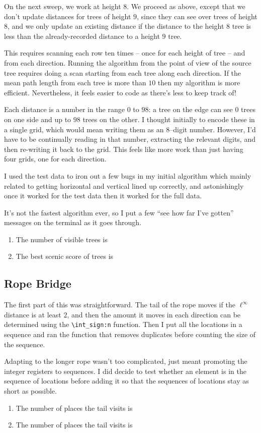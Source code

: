 \documentclass{article}
\begin{document}
On the next sweep, we work at height \(8\).
We proceed as above, except that we don't update distances for trees of height \(9\), since they can see over trees of height \(8\), and we only update an existing distance if the distance to the height \(8\) tree is less than the already-recorded distance to a height \(9\) tree.


This requires scanning each row ten times -- once for each height of tree --  and from each direction.
Running the algorithm from the point of view of the source tree requires doing a scan starting from each tree along each direction.
If the mean path length from each tree is more than \(10\) then my algorithm is more efficient.
Nevertheless, it feels easier to code as there's less to keep track of!

Each distance is a number in the range \(0\) to \(98\): a tree on the edge can see \(0\) trees on one side and up to \(98\) trees on the other.
I thought initially to encode these in a single grid, which would mean writing them as an \(8\)--digit number.
However, I'd have to be continually reading in that number, extracting the relevant digits, and then re-writing it back to the grid.
This feels like more work than just having four grids, one for each direction.

I used the test data to iron out a few bugs in my initial algorithm which mainly related to getting horizontal and vertical lined up correctly, and astonishingly once it worked for the test data then it worked for the full data.

It's not the fastest algorithm ever, so I put a few ``see how far I've gotten'' messages on the terminal as it goes through.

\begin{enumerate}
\item The number of visible trees is 
\item The best scenic score of trees is %
\end{enumerate}

\subsection{Rope Bridge}

The first part of this was straightforward.
The tail of the rope moves if the \(\ell^\infty\) distance is at least \(2\), and then the amount it moves in each direction can be determined using the \Verb!\int_sign:n! function.
Then I put all the locations in a sequence and ran the function that removes duplicates before counting the size of the sequence.

Adapting to the longer rope wasn't too complicated, just meant promoting the integer registers to sequences.
I did decide to test whether an element is in the sequence of locations before adding it so that the sequences of locations stay as short as possible.

\begin{enumerate}
\item The number of places the tail visits is 
\item The number of places the tail visits is 
\end{enumerate}
\end{document}
